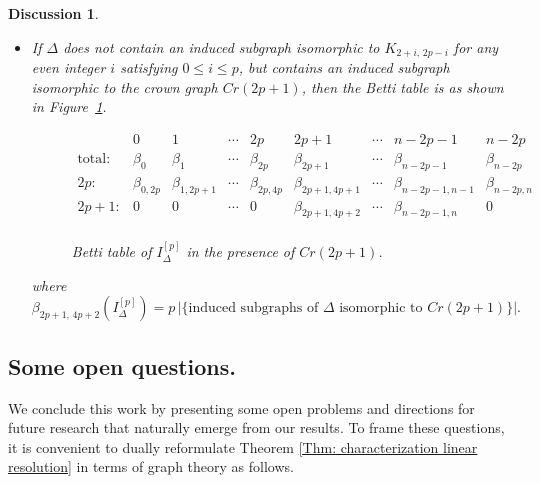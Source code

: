 \documentclass[12pt]{amsart}
\newtheorem{Discussion}[Theorem]{Discussion}
\begin{document}
\begin{Discussion}
\begin{enumerate}
\begin{itemize}
where \[
\beta_{1,2p+2}(I_{\Delta}^{[p]})
=
\sum_{\substack{0 \leq i \leq p \\ i \text{ even}}} \big\vert\{\text{induced subgraphs of } \Delta \text{ isomorphic to } K_{2+i,\,2p-i}\}\big\vert.%
\]

    \item[2c.] If $\Delta$ does not contain an induced subgraph isomorphic to $K_{2+i,\,2p-i}$ for any even integer $i$ satisfying $0 \leq i \leq p$, but contains an induced subgraph isomorphic to the crown graph $Cr(2p+1)$, then the Betti table is as shown in Figure~\ref{Fig:BettiShapes2}.

\begin{figure}[h]
\centering
$\begin{array}{r|ccccccccc}
      & 0 & 1 & \cdots & 2p & 2p+1 & \cdots & n-2p-1 & n-2p \\
\hline
\text{total:} & \beta_{0} & \beta_{1} & \cdots & \beta_{2p} & \beta_{2p+1} & \cdots & \beta_{n-2p-1} & \beta_{n-2p} \\
\hline
2p:   & \beta_{0, 2p} & \beta_{1, 2p+1} & \cdots & \beta_{2p, 4p} & \beta_{2p+1, 4p+1} & \cdots & \beta_{n-2p-1, n-1} & \beta_{n-2p, n} \\
2p+1: & 0 & 0 & \cdots & 0 & \beta_{2p+1, 4p+2} & \cdots & \beta_{n-2p-1, n} & 0 \\
\end{array}$
\caption{Betti table of $I_{\Delta}^{[p]}$ in the presence of $Cr(2p+1)$.}
\label{Fig:BettiShapes2}
\end{figure}
where \[
\beta_{2p+1,\,4p+2} (I_{\Delta}^{[p]}) =
p\,\bigl|\bigl\{\text{induced subgraphs of } \Delta \text{ isomorphic to } Cr(2p+1)\bigr\}\bigr|.
\]
\end{itemize}

\end{enumerate}
\end{Discussion}





\subsection{Some open questions.}\label{SubSec:open question} We conclude this work by presenting some open problems and directions for future research that naturally emerge from our results. To frame these questions, it is convenient to dually reformulate Theorem \ref{Thm: characterization linear resolution} in terms of graph theory as follows.
\end{document}
